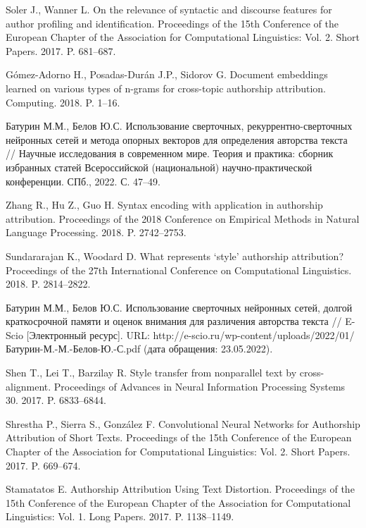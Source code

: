 \documentclass{article}
\begin{document}
\begin{thebibliography}{9}
\makeatletter
\renewcommand\@biblabel[1]{{#1.}}
\makeatother
{}
Soler J., Wanner L. On the relevance of syntactic and discourse features for author profiling and identification. Proceedings of the 15th Conference of the European Chapter of the Association for Computational Linguistics: Vol. 2. Short Papers. 2017. P. 681–687.

Gómez-Adorno H., Posadas-Durán J.P., Sidorov G. Document embeddings learned on various types of n-grams for cross-topic authorship attribution. Computing. 2018. P. 1–16.

Батурин М.М., Белов Ю.С. Использование сверточных, рекуррентно-сверточных нейронных сетей и метода опорных векторов для определения авторства текста // Научные исследования в современном мире. Теория и практика: сборник избранных статей Всероссийской (национальной) научно-практической конференции. СПб., 2022. С. 47–49.

Zhang R., Hu Z., Guo H. Syntax encoding with application in authorship attribution. Proceedings of the 2018 Conference on Empirical Methods in Natural Language Processing. 2018. P. 2742–2753.

Sundararajan K., Woodard D. What represents ‘style’ authorship attribution? Proceedings of the 27th International Conference on Computational Linguistics. 2018. P. 2814–2822.

Батурин М.М., Белов Ю.С. Использование сверточных нейронных сетей, долгой краткосрочной памяти и оценок внимания для различения авторства текста // E-Scio [Электронный ресурс]. URL: http://e-scio.ru/wp-content/uploads/2022/01/Батурин-М.-М.-Белов-Ю.-С.pdf (дата обращения: 23.05.2022).

Shen T., Lei T., Barzilay R. Style transfer from nonparallel text by cross-alignment. Proceedings of Advances in Neural Information Processing Systems 30. 2017. P. 6833–6844.

Shrestha P., Sierra S., González F. Convolutional Neural Networks for Authorship Attribution of Short Texts. Proceedings of the 15th Conference of the European Chapter of the Association for Computational Linguistics: Vol. 2. Short Papers. 2017. P. 669–674.

Stamatatos E. Authorship Attribution Using Text Distortion. Proceedings of the 15th Conference of the European Chapter of the Association for Computational Linguistics: Vol. 1. Long Papers. 2017. P. 1138–1149.

\end{thebibliography}
    
\end{document}
